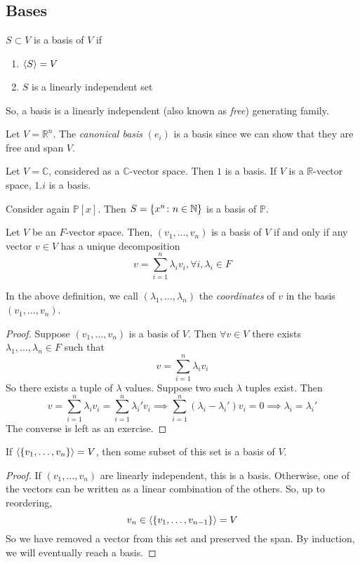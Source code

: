 \subsection{Bases}
\begin{definition}
	\( S \subset V \) is a basis of \( V \) if
	\begin{enumerate}
		\item \( \left\langle{} S \right\rangle = V \)
		\item \( S \) is a linearly independent set
	\end{enumerate}
	So, a basis is a linearly independent (also known as \textit{free}) generating family.
\end{definition}
\begin{example}
	Let \( V = \mathbb R^n \).
	The \textit{canonical basis} \( (e_i) \) is a basis since we can show that they are free and span \( V \).
\end{example}
\begin{example}
	Let \( V = \mathbb C \), considered as a \( \mathbb C \)-vector space.
	Then \( \qty{1} \) is a basis.
	If \( V \) is a \( \mathbb R \)-vector space, \( \qty{1,i} \) is a basis.
\end{example}
\begin{example}
	Consider again \( \mathbb P[x] \).
	Then \( S = \qty{x^n \colon n \in \mathbb N} \) is a basis of \( \mathbb P \).
\end{example}
\begin{lemma}
	Let \( V \) be an \( F \)-vector space.
	Then, \( (v_1, \dots, v_n) \) is a basis of \( V \) if and only if any vector \( v \in V \) has a unique decomposition
	\[
		v = \sum_{i=1}^n \lambda_i v_i, \forall i, \lambda_i \in F
	\]
\end{lemma}
In the above definition, we call \( (\lambda_1, \dots, \lambda_n) \) the \textit{coordinates} of \( v \) in the basis \( (v_1, \dots, v_n) \).
\begin{proof}
	Suppose \( (v_1, \dots, v_n) \) is a basis of \( V \).
	Then \( \forall v \in V \) there exists \( \lambda_1, \dots, \lambda_n \in F \) such that
	\[
		v = \sum_{i=1}^n \lambda_i v_i
	\]
	So there exists a tuple of \( \lambda \) values.
	Suppose two such \( \lambda \) tuples exist.
	Then
	\[
		v = \sum_{i=1}^n \lambda_i v_i = \sum_{i=1}^n \lambda_i' v_i \implies \sum_{i=1}^n (\lambda_i - \lambda_i') v_i = 0 \implies \lambda_i = \lambda_i'
	\]
	The converse is left as an exercise.
\end{proof}
\begin{lemma}
	If \( \left\langle{} \qty{v_1, \dots, v_n} \right\rangle = V \), then some subset of this set is a basis of \( V \).
\end{lemma}
\begin{proof}
	If \( (v_1, \dots, v_n) \) are linearly independent, this is a basis.
	Otherwise, one of the vectors can be written as a linear combination of the others.
	So, up to reordering,
	\[
		v_n \in \left\langle{} \qty{v_1, \dots, v_{n-1}} \right\rangle = V
	\]
	So we have removed a vector from this set and preserved the span.
	By induction, we will eventually reach a basis.
\end{proof}

